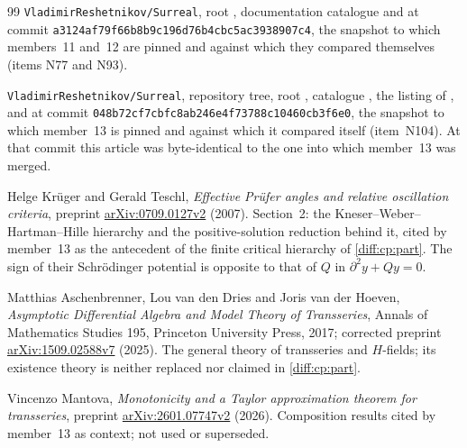 \documentclass[11pt,letterpaper]{article}
\numberwithin{equation}{section}
\theoremstyle{definition}
\theoremstyle{remark}
\newcommand{\der}{\partial}
\newcommand{\Repo}{\texttt{VladimirReshetnikov/Surreal}}
\newcommand{\CommitC}{\nolinkurl{a3124af79f66b8b9c196d76b4cbc5ac3938907c4}}
\newcommand{\CommitD}{\nolinkurl{048b72cf7cbfc8ab246e4f73788c10460cb3f6e0}}
\begin{document}
\begin{thebibliography}{99}
\Repo, root , documentation catalogue  and
 at commit \CommitC, the
snapshot to which members~11 and~12 are pinned and against which they compared
themselves (items N77 and N93).

\Repo, repository tree, root , catalogue ,
the listing of , and
 at commit \CommitD, the
snapshot to which member~13 is pinned and against which it compared itself
(item~N104). At that commit this article was byte-identical to the one into
which member~13 was merged.

Helge Kr\"uger and Gerald Teschl,
\emph{Effective Pr\"ufer angles and relative oscillation criteria},
preprint \href{https://arxiv.org/abs/0709.0127v2}{arXiv:0709.0127v2} (2007).
Section~2: the Kneser--Weber--Hartman--Hille hierarchy and the positive-solution
reduction behind it, cited by member~13 as the antecedent of the finite critical
hierarchy of \cref{diff:cp:part}. The sign of their Schr\"odinger potential is
opposite to that of $Q$ in $\der^{2}y+Qy=0$.

Matthias Aschenbrenner, Lou van den Dries and Joris van der Hoeven,
\emph{Asymptotic Differential Algebra and Model Theory of Transseries},
Annals of Mathematics Studies 195, Princeton University Press, 2017;
corrected preprint \href{https://arxiv.org/abs/1509.02588}{arXiv:1509.02588v7}
(2025). The general theory of transseries and $H$-fields; its existence theory
is neither replaced nor claimed in \cref{diff:cp:part}.

Vincenzo Mantova,
\emph{Monotonicity and a Taylor approximation theorem for transseries},
preprint \href{https://arxiv.org/abs/2601.07747}{arXiv:2601.07747v2} (2026).
Composition results cited by member~13 as context; not used or superseded.

\end{thebibliography}
\end{document}
